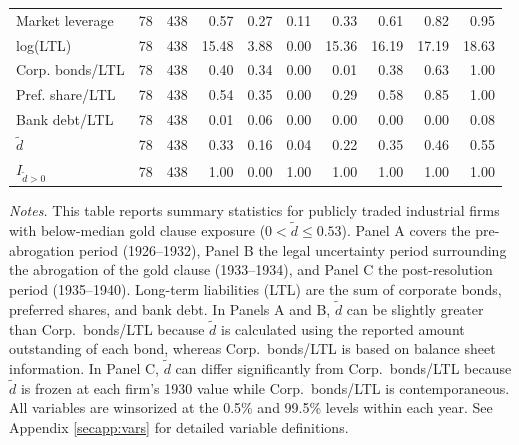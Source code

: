 \begin{table}[p]
\begin{threeparttable}
\begin{tabular}{lrrrrrrrrr}
            Market leverage & 78 & 438 & 0.57 & 0.27 & 0.11 & 0.33 & 0.61 & 0.82 & 0.95 \\
            log(LTL) & 78 & 438 & 15.48 & 3.88 & 0.00 & 15.36 & 16.19 & 17.19 & 18.63 \\
            Corp. bonds/LTL & 78 & 438 & 0.40 & 0.34 & 0.00 & 0.01 & 0.38 & 0.63 & 1.00 \\
            Pref. share/LTL & 78 & 438 & 0.54 & 0.35 & 0.00 & 0.29 & 0.58 & 0.85 & 1.00 \\
            Bank debt/LTL & 78 & 438 & 0.01 & 0.06 & 0.00 & 0.00 & 0.00 & 0.00 & 0.08 \\
            \ensuremath{\tilde{d}} & 78 & 438 & 0.33 & 0.16 & 0.04 & 0.22 & 0.35 & 0.46 & 0.55 \\
            \ensuremath{I_{\tilde{d}>0}} & 78 & 438 & 1.00 & 0.00 & 1.00 & 1.00 & 1.00 & 1.00 & 1.00 \\
            \bottomrule
        \end{tabular}
    \end{threeparttable}

    \vspace*{3mm} \justifying \noindent
\scriptsize{\textit{Notes.} This table reports summary statistics for publicly traded industrial firms with below-median gold clause exposure ($0 < \tilde{d} \leq 0.53$). Panel A covers the pre-abrogation period (1926--1932), Panel B the legal uncertainty period surrounding the abrogation of the gold clause (1933--1934), and Panel C the post-resolution period (1935--1940). Long-term liabilities (LTL) are the sum of corporate bonds, preferred shares, and bank debt. In Panels A and B, $\tilde{d}$ can be slightly greater than Corp.\ bonds/LTL because $\tilde{d}$ is calculated using the reported amount outstanding of each bond, whereas Corp.\ bonds/LTL is based on balance sheet information. In Panel C, $\tilde{d}$ can differ significantly from Corp.\ bonds/LTL because $\tilde{d}$ is frozen at each firm's 1930 value while Corp.\ bonds/LTL is contemporaneous. All variables are winsorized at the 0.5\% and 99.5\% levels within each year. See Appendix \ref{secapp:vars} for detailed variable definitions.}
\end{table}